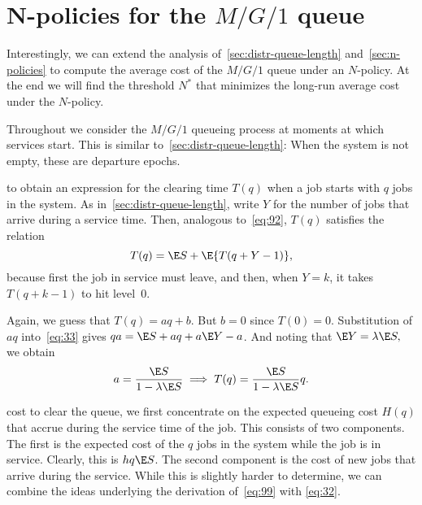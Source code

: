 


\section{N-policies for the $M/G/1$ queue}
\label{sec:n-policies-mg1}

Interestingly, we can extend the analysis of~\cref{sec:distr-queue-length} and~\cref{sec:n-policies} to compute the average cost of the $M/G/1$ queue under an $N$-policy.
At the end we will find the threshold $N^*$ that minimizes the long-run average cost under the $N$-policy.

Throughout we consider the $M/G/1$ queueing process at moments at which services start.
This is similar to~\cref{sec:distr-queue-length}: When the system is not empty, these are departure epochs.


 to obtain an expression for the clearing time $T(q)$ when a job starts with $q$ jobs in the system.
As in~\cref{sec:distr-queue-length}, write $Y$ for the number of jobs that arrive during a service time.
Then, analogous to~\cref{eq:92}, $T(q)$ satisfies the relation
\begin{equation}\label{eq:33}
  T(q) = \E S + \E{T(q+Y-1)},
\end{equation}
because first the job in service must leave, and then,  when $Y=k$,  it takes $T(q+k-1)$ to hit level~$0$.

Again, we guess that $T(q) = a q + b$.
But $b=0$ since $T(0)=0$.
Substitution of $a q$ into~\cref{eq:33} gives $q a =\E S + aq + a\E Y - a$. And noting that $\E Y = \lambda \E S,$ we  obtain
\begin{equation*}
a = \frac{\E S}{1-\lambda \E S} \implies T(q) = \frac{\E S}{1-\lambda \E S}q.
\end{equation*}

 cost to clear the queue, we first concentrate on the expected queueing cost $H(q)$ that accrue during the service time of the job.
This consists of two components.
The first is the expected cost of the $q$ jobs in the system while the job is in service.
Clearly, this is $h q \E S$.
The second component is the cost of new jobs that arrive during the service.
While this is slightly harder to determine, we can combine the ideas underlying the derivation of~\cref{eq:99} with \cref{eq:32}.

